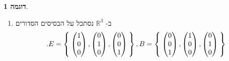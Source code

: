 \documentclass[12pt]{report}
\theoremstyle{plain}
\theoremstyle{definition}
\newtheorem{example}{דוגמה}[chapter]
\newcommand{\R}{\mathbb{R}}
\newcommand{\0}{\mathbf{0}}
\begin{document}
\begin{example}\
\begin{enumerate}[label=\alph*.]
\item 
ב-
$\R^3$
נסתכל על הבסיסים הסדורים
$$
.E=\Set{\begin{pmatrix}
1 \\
0 \\
0
\end{pmatrix},\begin{pmatrix}
0 \\
1 \\
0
\end{pmatrix},\begin{pmatrix}
0 \\
0 \\
1
\end{pmatrix}},B=\Set{\begin{pmatrix}
0 \\
0 \\
1
\end{pmatrix},\begin{pmatrix}
1 \\
0 \\
0
\end{pmatrix},\begin{pmatrix}
0 \\
1 \\
0
\end{pmatrix}}
$$


\end{enumerate}
\end{example}
\end{document}
